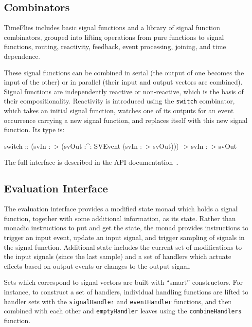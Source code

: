 \subsection{Combinators}
\label{section:System_Design_and_Interface-Combinators}

TimeFlies includes basic signal functions and a library of signal function
combinators, grouped into lifting operations from pure functions to signal
functions, routing, reactivity, feedback, event processing, joining, and time
dependence.

These signal functions can be combined in serial (the output of one becomes
the input of the other) or in parallel (their input and output vectors are
combined). Signal functions are independently reactive or non-reactive, which
is the basis of their compositionality. Reactivity is introduced using the
{\tt switch} combinator, which takes an initial signal function, watches
one of its outputs for an event occurrence carrying a new signal function,
and replaces itself with this new signal function. Its type is:

\begin{code}
switch ::    (svIn :~> (svOut :^: SVEvent (svIn :~> svOut)))
          -> svIn :~> svOut
\end{code}

The full interface is described in the API documentation~\cite{TimefliesAPI}.

\subsection{Evaluation Interface}
\label{subsection:System_Design_and_Interface-Evaluation_Interface}

The evaluation interface provides a modified state monad which holds a signal
function, together with some additional information, as its state.
Rather than monadic instructions to put and get the state, the monad provides instructions
to trigger an input event, update an input signal, and trigger sampling of
signals in the signal function. Additional state includes the current set of
modifications to the input signals (since the last sample) and a set of
handlers which actuate effects based on output events or changes to the output
signal.

Sets which correspond to signal vectors are built with ``smart'' constructors.
For instance, to construct a set of handlers, individual handling functions are
lifted to handler sets with the {\tt signalHandler} and {\tt eventHandler}
functions, and then combined with each other and {\tt emptyHandler} leaves
using the {\tt combineHandlers} function.

